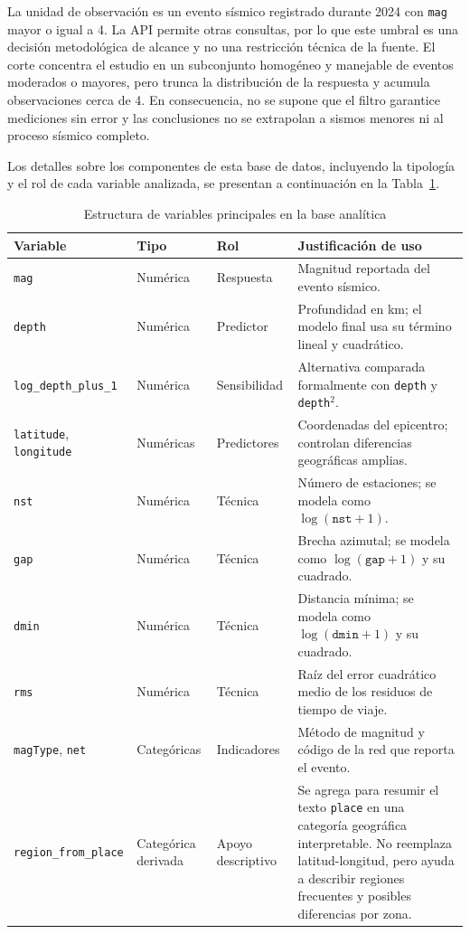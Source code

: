 \documentclass{style}
\newcommand{\var}[1]{\texttt{#1}}
\begin{document}
La unidad de observación es un evento sísmico registrado durante 2024 con \var{mag} mayor o igual a 4. La API permite otras consultas, por lo que este umbral es una decisión metodológica de alcance y no una restricción técnica de la fuente. El corte concentra el estudio en un subconjunto homogéneo y manejable de eventos moderados o mayores, pero trunca la distribución de la respuesta y acumula observaciones cerca de 4. En consecuencia, no se supone que el filtro garantice mediciones sin error y las conclusiones no se extrapolan a sismos menores ni al proceso sísmico completo.

Los detalles sobre los componentes de esta base de datos, incluyendo la tipología y el rol de cada variable analizada, se presentan a continuación en la Tabla~\ref{tab:variables_analisis}.



\begin{table}[H]
\centering
\caption{Estructura de variables principales en la base analítica}
\label{tab:variables_analisis}
\scriptsize
\begin{tabularx}{\textwidth}{lllX}
\toprule
Variable & Tipo & Rol & Justificación de uso \\
\midrule
\var{mag} & Numérica & Respuesta & Magnitud reportada del evento sísmico. \\
\var{depth} & Numérica & Predictor & Profundidad en km; el modelo final usa su término lineal y cuadrático. \\
\var{log\_depth\_plus\_1} & Numérica & Sensibilidad & Alternativa comparada formalmente con \var{depth} y \var{depth}$^2$. \\
\var{latitude}, \var{longitude} & Numéricas & Predictores & Coordenadas del epicentro; controlan diferencias geográficas amplias. \\
\var{nst} & Numérica & Técnica & Número de estaciones; se modela como $\log(\var{nst}+1)$. \\
\var{gap} & Numérica & Técnica & Brecha azimutal; se modela como $\log(\var{gap}+1)$ y su cuadrado. \\
\var{dmin} & Numérica & Técnica & Distancia mínima; se modela como $\log(\var{dmin}+1)$ y su cuadrado. \\
\var{rms} & Numérica & Técnica & Raíz del error cuadrático medio de los residuos de tiempo de viaje. \\
\var{magType}, \var{net} & Categóricas & Indicadores & Método de magnitud y código de la red que reporta el evento. \\
\var{region\_from\_place} & Categórica derivada & Apoyo descriptivo & Se agrega para resumir el texto \var{place} en una categoría geográfica interpretable. No reemplaza latitud-longitud, pero ayuda a describir regiones frecuentes y posibles diferencias por zona. \\
\bottomrule
\end{tabularx}
\end{table}
\end{document}

